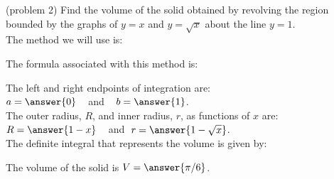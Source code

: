 \documentclass{ximera}
\begin{document}
\begin{problem}(problem 2)
Find the volume of the solid obtained by revolving the region bounded by the graphs of $y = x$ and $y = \sqrt x$ about the line $y = 1$.\\
The method we will use is:
\begin{multipleChoice}
\end{multipleChoice}

The formula associated with this method is:
\begin{multipleChoice}
\end{multipleChoice}

The left and right endpoints of integration are:\\
$a = \answer{0}\;\;\;$ and $\;\;\; b = \answer{1}$.\\
The outer radius, $R$, and inner radius, $r$, as functions of $x$ are:\\
$R = \answer{1-x} \;\;\;$ and $\; r = \answer{1-\sqrt{x}}$.\\

The definite integral that represents the volume is given by:\\
\begin{multipleChoice}
\end{multipleChoice}

The volume of the solid is $V = \answer{\pi/6}$.

\end{problem}
\end{document}
